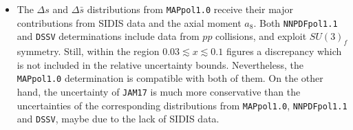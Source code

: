 \begin{itemize}
  \item The $\Delta s$ and $\Delta \bar{s}$ distributions from \texttt{MAPpol1.0} receive their major contributions from SIDIS data and the axial moment $a_8$. Both \texttt{NNPDFpol1.1} and \texttt{DSSV} determinations include data from $pp$ collisions, and exploit $SU(3)_f$ symmetry. Still, within the region $0.03 \lesssim x \lesssim 0.1$ figures a discrepancy which is not included in the relative uncertainty bounds. Nevertheless, the \texttt{MAPpol1.0} determination is compatible with both of them. On the other hand, the uncertainty of \texttt{JAM17} is much more conservative than the uncertainties of the corresponding distributions from \texttt{MAPpol1.0}, \texttt{NNPDFpol1.1} and \texttt{DSSV}, maybe due to the lack of SIDIS data.
\end{itemize}

